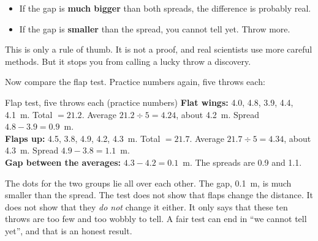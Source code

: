 \begin{itemize}[leftmargin=1.6em,itemsep=0.2em]
\item If the gap is \textbf{much bigger} than both spreads, the difference is probably real.
\item If the gap is \textbf{smaller} than the spread, you cannot tell yet. Throw more.
\end{itemize}

This is only a rule of thumb. It is not a proof, and real scientists use more careful methods. But it stops you from calling a lucky throw a discovery.

Now compare the flap test. Practice numbers again, five throws each:

\begin{worked}{Flap test, five throws each (practice numbers)}
\textbf{Flat wings:} 4.0, 4.8, 3.9, 4.4, 4.1~m. Total $=21.2$. Average $21.2\div5=4.24$, about 4.2~m. Spread $4.8-3.9=0.9$~m.\\
\textbf{Flaps up:} 4.5, 3.8, 4.9, 4.2, 4.3~m. Total $=21.7$. Average $21.7\div5=4.34$, about 4.3~m. Spread $4.9-3.8=1.1$~m.\\
\textbf{Gap between the averages:} $4.3-4.2=0.1$~m. The spreads are 0.9 and 1.1.
\end{worked}

\begin{center}
\end{center}

The dots for the two groups lie all over each other. The gap, 0.1~m, is much smaller than the spread. The test does not show that flaps change the distance. It does not show that they \emph{do not} change it either. It only says that these ten throws are too few and too wobbly to tell. A fair test can end in ``we cannot tell yet'', and that is an honest result.

